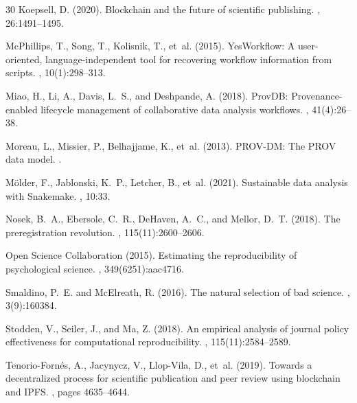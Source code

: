 \documentclass[11pt,a4paper]{article}
\begin{document}
\begin{thebibliography}{30}
Koepsell, D. (2020).
\newblock Blockchain and the future of scientific publishing.
, 26:1491--1495.

McPhillips, T., Song, T., Kolisnik, T., et~al. (2015).
\newblock YesWorkflow: A user-oriented, language-independent tool for recovering workflow information from scripts.
, 10(1):298--313.

Miao, H., Li, A., Davis, L.~S., and Deshpande, A. (2018).
\newblock ProvDB: Provenance-enabled lifecycle management of collaborative data analysis workflows.
, 41(4):26--38.

Moreau, L., Missier, P., Belhajjame, K., et~al. (2013).
\newblock PROV-DM: The PROV data model.
.

M\"{o}lder, F., Jablonski, K.~P., Letcher, B., et~al. (2021).
\newblock Sustainable data analysis with Snakemake.
, 10:33.

Nosek, B.~A., Ebersole, C.~R., DeHaven, A.~C., and Mellor, D.~T. (2018).
\newblock The preregistration revolution.
, 115(11):2600--2606.

Open Science Collaboration (2015).
\newblock Estimating the reproducibility of psychological science.
, 349(6251):aac4716.

Smaldino, P.~E. and McElreath, R. (2016).
\newblock The natural selection of bad science.
, 3(9):160384.

Stodden, V., Seiler, J., and Ma, Z. (2018).
\newblock An empirical analysis of journal policy effectiveness for computational reproducibility.
, 115(11):2584--2589.

Tenorio-Forn\'{e}s, A., Jacynycz, V., Llop-Vila, D., et~al. (2019).
\newblock Towards a decentralized process for scientific publication and peer review using blockchain and IPFS.
, pages 4635--4644.


\end{thebibliography}
\end{document}
